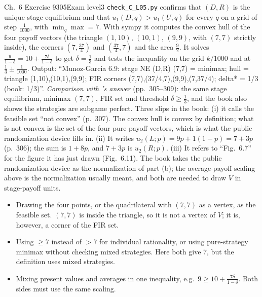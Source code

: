 \begin{exsol}{\MG{} Ch.~6 Exercise 9}{305}{Exam level}{3}
\verify \texttt{check\_C\_L05.py} confirms that $(D,R)$ is the unique stage equilibrium and that
$u_1(D,q) > u_1(U,q)$ for every $q$ on a grid of step $\frac1{1000}$, with
$\min_q\max = 7$. With sympy it computes the convex hull of the four payoff vectors (the triangle
$(1,10)$, $(10,1)$, $(9,9)$, with $(7,7)$ strictly inside), the corners $(7,\frac{37}4)$ and
$(\frac{37}4,7)$ and the area $\frac92$. It solves $\frac9{1-\delta} = 10 + \frac{7\delta}{1-\delta}$ to
get $\delta = \frac13$ and tests the inequality on the grid $k/1000$ and at $\frac13 \pm
\frac1{1000}$. Output: ``Munoz-Garcia 6.9: stage NE (D,R) (7,7) = minimax; hull = triangle
(1,10),(10,1),(9,9); FIR corners (7,7),(37/4,7),(9,9),(7,37/4); delta* = 1/3 (book: 1/3)''.
\emph{Comparison with \MG{}'s answer} (pp.~305--309): the same stage equilibrium, minimax $(7,7)$,
FIR set and threshold $\delta \ge \frac13$, and the book also shows the strategies are subgame
perfect. Three slips in the book: (i) it calls the feasible set ``not convex'' (p.~307). The convex
hull is convex by definition; what is not convex is the set of the four pure payoff vectors, which
is what the public randomization device fills in. (ii) It writes $u_2(L;p) = 9p + 1(1-p) = 7 + 3p$
(p.~306); the sum is $1 + 8p$, and $7 + 3p$ is $u_2(R;p)$. (iii) It refers to ``Fig.~6.7'' for the
figure it has just drawn (Fig.~6.11). The book takes the public randomization device as the
normalization of part (b); the average-payoff scaling above is the normalization usually meant, and
both are needed to draw $V$ in stage-payoff units.

\mistakes
\begin{itemize}
  \item Drawing the four points, or the quadrilateral with $(7,7)$ as a vertex, as the feasible set.
  $(7,7)$ is inside the triangle, so it is not a vertex of $V$; it is, however, a corner of the FIR set.
  \item Using $\ge 7$ instead of $> 7$ for individual rationality, or using pure-strategy minimax
  without checking mixed strategies. Here both give 7, but the definition uses mixed strategies.
  \item Mixing present values and averages in one inequality, e.g.\ $9 \ge 10 + \frac{7\delta}{1-\delta}$.
  Both sides must use the same scaling.
\end{itemize}

\end{exsol}
